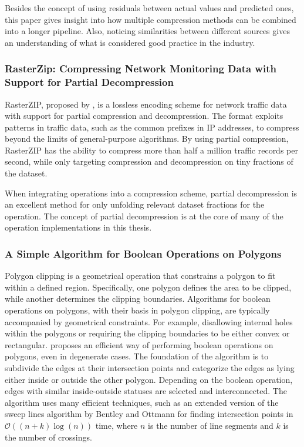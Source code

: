 Besides the concept of using residuals between actual values and predicted ones, this paper gives insight into how multiple compression methods can be combined into a longer pipeline. Also, noticing similarities between different sources gives an understanding of what is considered good practice in the industry.

\subsubsection{RasterZip: Compressing Network Monitoring Data with Support for Partial Decompression}

RasterZIP, proposed by \citet{localDecomp}, is a lossless encoding scheme for network traffic data with support for partial compression and decompression. The format exploits patterns in traffic data, such as the common prefixes in IP addresses, to compress beyond the limits of general-purpose algorithms. By using partial compression, RasterZIP has the ability to compress more than half a million traffic records per second, while only targeting compression and decompression on tiny fractions of the dataset.

When integrating operations into a compression scheme, partial decompression is an excellent method for only unfolding relevant dataset fractions for the operation. The concept of partial decompression is at the core of many of the operation implementations in this thesis.

\subsubsection{A Simple Algorithm for Boolean Operations on Polygons}
Polygon clipping is a geometrical operation that constrains a polygon to fit within a defined region. Specifically, one polygon defines the area to be clipped, while another determines the clipping boundaries. Algorithms for boolean operations on polygons, with their basis in polygon clipping, are typically accompanied by geometrical constraints. For example, disallowing internal holes within the polygons or requiring the clipping boundaries to be either convex or rectangular. \citet{polygonclipping} proposes an efficient way of performing boolean operations on polygons, even in degenerate cases. The foundation of the algorithm is to subdivide the edges at their intersection points and categorize the edges as lying either inside or outside the other polygon. Depending on the boolean operation, edges with similar inside-outside statuses are selected and interconnected. The algorithm uses many efficient techniques, such as an extended version of the sweep lines algorithm by Bentley and Ottmann \cite{sweeplines} for finding intersection points in $\mathcal{O}((n + k) \log (n))$ time, where $n$ is the number of line segments and $k$ is the number of crossings.

